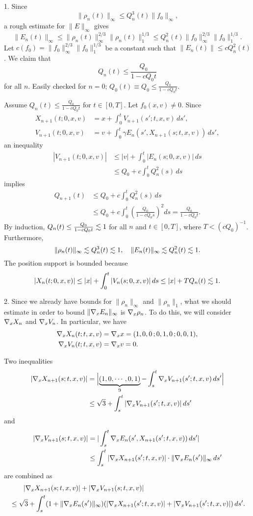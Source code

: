 \documentclass[11pt]{amsart}
\begin{document}
\begin{pf}
1.
Since
\[\|\rho_n(t)\|_\infty\le Q_n^3(t)\|f_0\|_\infty,\]
a rough estimate for $\|E\|_\infty$ gives
\[\|E_n(t)\|_\infty\le\|\rho_n(t)\|_\infty^{2/3}\|\rho_n(t)\|_1^{1/3}\le Q_n^2(t)\|f_0\|_\infty^{2/3}\|f_0\|_1^{1/3}.\]
Let $c(f_0)=\|f_0\|_\infty^{2/3}\|f_0\|_1^{1/3}$ be a constant such that $\|E_n(t)\|\le cQ_n^2(t)$.
We claim that
\[Q_n(t)\le\frac{Q_0}{1-cQ_0t}\]
for all $n$.
Easily checked for $n=0$; $Q_0(t)\equiv Q_0\le\frac{Q_0}{1-cQ_0t}$.

Assume $Q_n(t)\le\frac{Q_0}{1-cQ_0t}$ for $t\in[0,T]$.
Let $f_0(x,v)\ne0$.
Since
\begin{align*}
X_{n+1}(t;0,x,v)&=x+\int_0^tV_{n+1}(s';t,x,v)\,ds',\\
V_{n+1}(t;0,x,v)&=v+\int_0^t\gamma E_n(s',X_{n+1}(s;t,x,v))\,ds',
\end{align*}
an inequality
\begin{align*}
|V_{n+1}(t;0,x,v)|
&\le|v|+\int_0^t|E_n(s;0,x,v)|\,ds\\
&\le Q_0+c\int_0^tQ_n^2(s)\,ds
\end{align*}
implies
\begin{align*}
Q_{n+1}(t)
&\le Q_0+c\int_0^tQ_n^2(s)\,ds\\
&\le Q_0+c\int_0^t\left(\frac{Q_0}{1-cQ_0s}\right)^2ds
=\frac{Q_0}{1-cQ_0t}.
\end{align*}
By induction, $Q_n(t)\le\frac{Q_0}{1-cQ_0t}\lesssim1$ for all $n$ and $t\in[0,T]$, where $T<(cQ_0)^{-1}$.
Furthermore,
\[\|\rho_n(t)\|_\infty\lesssim Q_n^3(t)\lesssim1,\quad\|E_n(t)\|_\infty\lesssim Q_n^2(t)\lesssim1.\]
The position support is bounded because
\[|X_n(t;0,x,v)|\le|x|+\int_0^t|V_n(s;0,x,v)|\,ds\le|x|+TQ_n(t)\lesssim1.\]

2.
Since we already have bounds for $\|\rho_n\|_\infty$ and $\|\rho_n\|_1$, what we should estimate in order to bound $\|\nabla_xE_n\|_\infty$ is $\nabla_x\rho_n$.
To do this, we will consider $\nabla_xX_n$ and $\nabla_xV_n$.
In particular, we have
\begin{align*}
\nabla_xX_n(t;t,x,v)&=\nabla_xx=(1,0,0\,;0,1,0\,;0,0,1),\\
\nabla_xV_n(t;t,x,v)&=\nabla_xv=0.
\end{align*}

Two inequalities
\begin{align*}
|\nabla_xX_{n+1}(s;t,x,v)|
&=\Bigl|\underbrace{(1,0,\cdots,0,1)}_{9}-\int_s^t\nabla_xV_{n+1}(s';t,x,v)\,ds'\Bigr|\\
&\le\sqrt3+\int_s^t|\nabla_xV_{n+1}(s';t,x,v)|\,ds'
\end{align*}
and
\begin{align*}
|\nabla_xV_{n+1}(s;t,x,v)|
&=|\int_s^t\nabla_xE_n(s',X_{n+1}(s';t,x,v))\,ds'|\\
&\le\int_s^t|\nabla_xX_{n+1}(s';t,x,v)|\cdot\|\nabla_xE_n(s')\|_\infty\,ds'
\end{align*}
are combined as
\begin{align*}
&\qquad|\nabla_xX_{n+1}(s;t,x,v)|+|\nabla_xV_{n+1}(s;t,x,v)|\\
&\le\sqrt3+\int_s^t(1+\|\nabla_xE_n(s')\|_\infty)(|\nabla_xX_{n+1}(s';t,x,v)|+|\nabla_xV_{n+1}(s';t,x,v)|)\,ds'.
\end{align*}


\end{pf}
\end{document}
